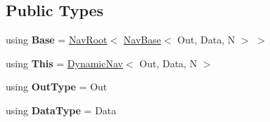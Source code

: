 \subsection*{Public Types}
\begin{DoxyCompactItemize}
\item 
\mbox{\label{classDynamicNav_a07643e4956c551dd6e73113bb64b907c}} 
using {\bfseries Base} = \hyperlink{structNavRoot}{Nav\+Root}$<$ \hyperlink{classNavBase}{Nav\+Base}$<$ Out, Data, N $>$ $>$
\item 
\mbox{\label{classDynamicNav_a87dc6c1f5969829af5e073e6d102c443}} 
using {\bfseries This} = \hyperlink{classDynamicNav}{Dynamic\+Nav}$<$ Out, Data, N $>$
\item 
\mbox{\label{classDynamicNav_a680da5af4f7c9e2f21222546fa383e79}} 
using {\bfseries Out\+Type} = Out
\item 
\mbox{\label{classDynamicNav_a917ade6366ab1535cd2339d69c8a2afa}} 
using {\bfseries Data\+Type} = Data
\end{DoxyCompactItemize}
